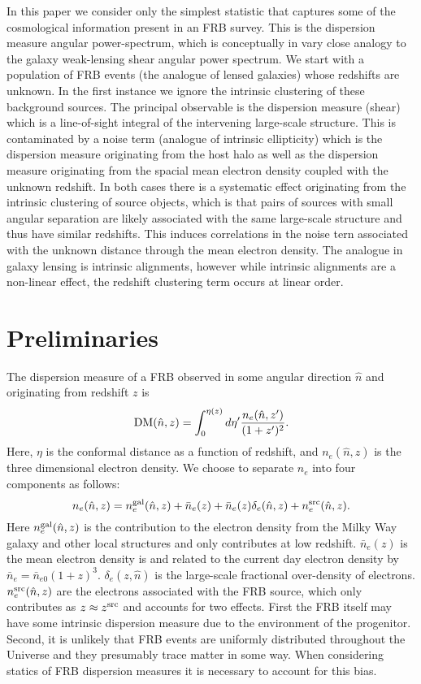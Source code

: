 \documentclass[onecolumn,prd,noshowpacs,nofootinbib,amsmath,amssymb]{revtex4}
\begin{document}
In this paper we consider only the simplest statistic that captures some of
the cosmological information present in an FRB survey.  This is the dispersion
measure angular power-spectrum, which is conceptually in vary close analogy to
the galaxy weak-lensing shear angular power spectrum. We start with a
population of FRB events (the analogue of lensed galaxies) whose redshifts are
unknown.  In the first instance we ignore the intrinsic clustering of these
background sources.  The principal observable is the dispersion measure
(shear) which is a line-of-sight integral of the intervening large-scale
structure.  This is contaminated by a noise term (analogue of intrinsic
ellipticity) which is the dispersion
measure originating from the host halo as well as the dispersion measure
originating from the spacial mean electron density coupled with the unknown
redshift.  In both cases there is a systematic effect originating from the
intrinsic clustering of source objects, which is that pairs of sources with
small angular separation are likely associated with the same large-scale
structure and thus have similar redshifts.  This induces correlations in the
noise tern associated with the unknown distance through the mean electron
density. The analogue in galaxy lensing is intrinsic alignments, however while
intrinsic alignments are a non-linear effect, the redshift clustering term occurs
at linear order.


\section{Preliminaries}

The dispersion measure of a FRB observed in some angular direction $\hat{n}$ and
originating from redshift $z$ is
\begin{equation}
    {\rm DM}(\hat{n}, z) = \int_0^{\eta(z)} d\eta'
        \frac{n_e(\hat{n}, z')}{(1+z')^2}.
\end{equation}
Here, $\eta$ is the conformal distance as a function of redshift, and
$n_e(\hat{n}, z)$ is the three dimensional electron density.  We choose to
separate $n_e$ into four components as follows:
\begin{equation}
\label{e:ne_sep}
n_e(\hat{n}, z) = n_e^{\rm gal}(\hat{n}, z) + \bar{n}_e(z) +
    \bar{n}_e(z)\delta_e(\hat{n}, z) + n_e^{\rm src}(\hat{n}, z).
\end{equation}
Here $n_e^{\rm gal}(\hat{n}, z)$ is the contribution to the electron density
from the Milky Way galaxy and other local structures and only contributes at
low redshift. $\bar{n}_e(z)$ is the mean electron density is and related to the
current day electron density by $\bar{n}_e = \bar{n}_{e0} (1+z)^3$. 
$\delta_e(z,\hat{n})$ is the large-scale fractional over-density of electrons.
$n_e^{\rm src}(\hat{n}, z)$ are the electrons associated with the FRB source,
which only contributes as $z \approx z^{\rm src}$ and accounts for two effects.
First the FRB itself
may have some intrinsic dispersion measure due to the environment of the
progenitor.  Second, it is unlikely that FRB events are uniformly distributed
throughout the Universe and they presumably trace matter in some way. When
considering statics of FRB dispersion measures it is necessary to account for
this bias.
\end{document}
